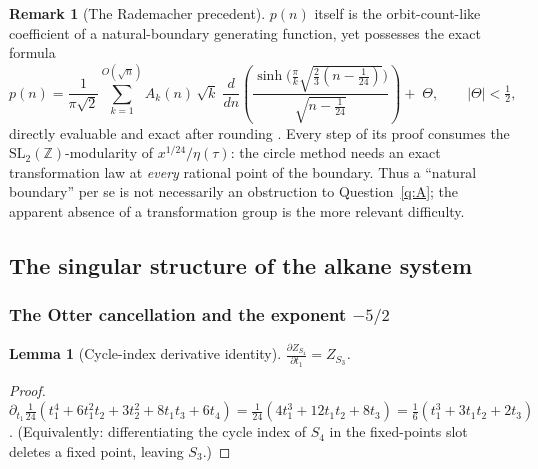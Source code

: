 \documentclass[11pt]{article}
\newtheorem{lemma}[theorem]{Lemma}
\theoremstyle{definition}
\newtheorem{remark}[theorem]{Remark}
\newcommand{\ZZ}{\mathbb{Z}}
\begin{document}
\begin{remark}[The Rademacher precedent]\label{rem:rademacher}
$p(n)$ itself is the orbit-count-like coefficient of a natural-boundary
generating function, yet possesses the exact formula
\[
p(n)=\frac{1}{\pi\sqrt2}\sum_{k=1}^{O(\sqrt n)}A_k(n)\,\sqrt{k}\;
\frac{d}{dn}\!\left(\frac{\sinh\bigl(\tfrac{\pi}{k}
\sqrt{\tfrac23(n-\tfrac1{24})}\bigr)}{\sqrt{n-\tfrac1{24}}}\right)
+\;\Theta,\qquad |\Theta|<\tfrac12,
\]
directly evaluable and exact after rounding \cite{Rademacher1937}. Every step of
its proof consumes the $\mathrm{SL}_2(\ZZ)$-modularity of
$x^{1/24}/\eta(\tau)$: the circle method needs an exact transformation law at
\emph{every} rational point of the boundary. Thus a ``natural boundary'' per se
is not necessarily an obstruction to Question~\ref{q:A}; the apparent absence of
a transformation group is the more relevant difficulty.
\end{remark}

\subsection{The singular structure of the alkane system}

\subsubsection{The Otter cancellation and the exponent $-5/2$}

\begin{lemma}[Cycle-index derivative identity]\label{lem:cancel}
$\displaystyle \frac{\partial Z_{S_4}}{\partial t_1}=Z_{S_3}$.
\end{lemma}

\begin{proof}
$\partial_{t_1}\tfrac1{24}(t_1^4+6t_1^2t_2+3t_2^2+8t_1t_3+6t_4)
=\tfrac1{24}(4t_1^3+12t_1t_2+8t_3)=\tfrac16(t_1^3+3t_1t_2+2t_3)$.
(Equivalently: differentiating the cycle index of $S_4$ in the
fixed-points slot deletes a fixed point, leaving $S_3$.)
\end{proof}
\end{document}
